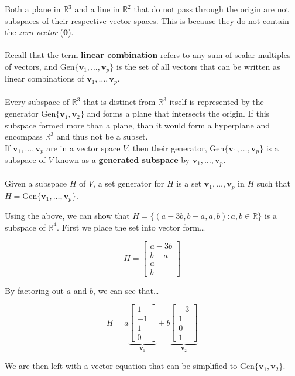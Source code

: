\documentclass[12pt]{article}
\newcommand{\gen}[1]{\mathrm{Gen}\{{#1}\}}
\newcommand{\R}{\mathbb{R}}
\newcommand{\bt}[1]{\textbf{{#1}}}
\newcommand{\bm}[1]{\mathbf{{#1}}}
\newcommand{\mb}{\begin{bmatrix}}
\newcommand{\me}{\end{bmatrix}}
\begin{document}
Both a plane in $\R^3$ and a line in $\R^2$ that do not pass through the origin are not subspaces of
their respective vector spaces. This is because they do not contain the \emph{zero vector} ($\bm{0}$). \\ \\

Recall that the term \bt{linear combination} refers to any sum of scalar multiples of vectors, and $\gen{\bm{v}_1,\dots,\bm{v}_p}$ is the set of all vectors
that can be written as linear combinations of $\bm{v}_1,\dots,\bm{v}_p$. \\ \\

Every subspace of $\R^3$ that is distinct from $\R^3$ itself is represented by the generator $\gen{\bm{v}_1, \bm{v}_2}$
and forms a plane that intersects the origin. If this subspace formed more than a plane, than it would form a hyperplane and encompass $\R^3$
and thus not be a subset. \\

If $\bm{v}_1,\dots,\bm{v}_p$ are in a vector space $V$, then their generator, $\gen{\bm{v}_1,\dots,\bm{v}_p}$ is a subspace of $V$
known as a \bt{generated subspace} by $\bm{v}_1,\dots,\bm{v}_p$. \\ \\

Given a subspace $H$ of $V$, a set generator for $H$ is a set ${\bm{v}_1,\dots,\bm{v}_p}$ in $H$ such that $H = \gen{\bm{v}_1,\dots,\bm{v}_p}$.

Using the above, we can show that $H = \{(a-3b,b-a,a,b): a, b \in \R\}$ is a subspace of $\R^4$.
First we place the set into vector form\dots
    
$$H = \mb a - 3b \\ b - a \\ a \\ b \me$$

By factoring out $a$ and $b$, we can see that\dots

$$H = a \underbrace{\mb 1 \\ -1 \\ 1 \\ 0 \me}_{\bm{v}_1} + b \underbrace{\mb -3 \\ 1 \\ 0 \\ 1 \me}_{\bm{v}_2}$$

We are then left with a vector equation that can be simplified to $\gen{\bm{v}_1, \bm{v}_2}$. \\ \\
\end{document}

